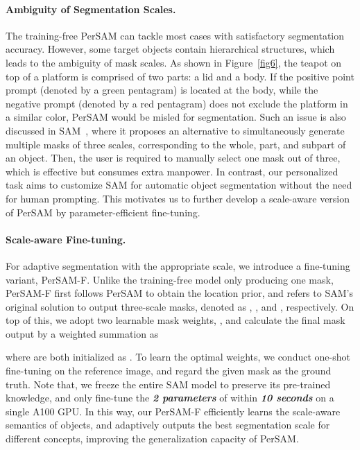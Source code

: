 \documentclass{article} \usepackage{iclr2024_conference,times}
\begin{document}
\paragraph{Ambiguity of Segmentation Scales.}
The training-free PerSAM can tackle most cases with satisfactory segmentation accuracy. However, some target objects contain hierarchical structures, which leads to the ambiguity of mask scales. As shown in Figure~\ref{fig6}, the teapot on top of a platform is comprised of two parts: a lid and a body. If the positive point prompt (denoted by a green pentagram) is located at the body, while the negative prompt (denoted by a red pentagram) does not exclude the platform in a similar color, PerSAM would be misled for segmentation.
Such an issue is also discussed in SAM~\citep{kirillov2023segment}, where it proposes an alternative to simultaneously generate multiple masks of three scales, corresponding to the whole, part, and subpart of an object. Then, the user is required to manually select one mask out of three, which is effective but consumes extra manpower. In contrast, our personalized task aims to customize SAM for automatic object segmentation without the need for human prompting. This motivates us to further develop a scale-aware version of PerSAM by parameter-efficient fine-tuning. 


\paragraph{Scale-aware Fine-tuning.}
For adaptive segmentation with the appropriate scale, we introduce a fine-tuning variant, PerSAM-F. Unlike the training-free model only producing one mask, PerSAM-F first follows PerSAM to obtain the location prior, and refers to SAM's original solution to output three-scale masks, denoted as , , and , respectively. On top of this, we adopt two learnable mask weights, , and calculate the final mask output by a weighted summation as

where  are both initialized as . To learn the optimal weights, we conduct one-shot fine-tuning on the reference image, and regard the given mask as the ground truth.
Note that, we freeze the entire SAM model to preserve its pre-trained knowledge, and only fine-tune the \textbf{\textit{2 parameters}} of  within \textbf{\textit{10 seconds}} on a single A100 GPU.
In this way, our PerSAM-F efficiently learns the scale-aware semantics of objects, and adaptively outputs the best segmentation scale for different concepts, improving the generalization capacity of PerSAM.
\end{document}

